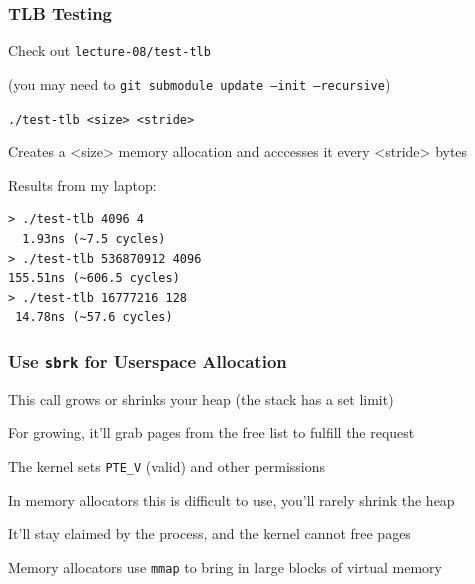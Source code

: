   \begin{frame}[fragile]
    \frametitle{TLB Testing}

    Check out \texttt{lecture-08/test-tlb}

    \hspace{2em} (you may need to \texttt{git submodule update --init --recursive})

    \vspace{2em}

    \texttt{./test-tlb <size> <stride>}

    \hspace{2em} Creates a <size> memory allocation and acccesses it every <stride> bytes

    \vspace{2em}

    Results from my laptop:

    \begin{lstlisting}
> ./test-tlb 4096 4        
  1.93ns (~7.5 cycles)
> ./test-tlb 536870912 4096
155.51ns (~606.5 cycles)
> ./test-tlb 16777216 128  
 14.78ns (~57.6 cycles)
    \end{lstlisting}
  \end{frame}

  \begin{frame}
    \frametitle{Use \texttt{sbrk} for Userspace Allocation}

    This call grows or shrinks your heap (the stack has a set limit)

    \vspace{2em}

    For growing, it'll grab pages from the free list to fulfill the request

    \hspace{2em} The kernel sets \texttt{PTE\_V} (valid) and other permissions

    \vspace{2em}

    In memory allocators this is difficult to use, you'll rarely shrink the heap

    \hspace{2em} It'll stay claimed by the process, and the kernel cannot free
    pages

    \vspace{2em}

    Memory allocators use \texttt{mmap} to bring in large blocks of virtual
    memory
  \end{frame}

